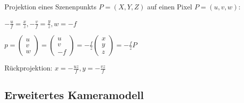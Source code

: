 \documentclass[paper=a4, fontsize=11pt]{scrartcl} %
\numberwithin{equation}{section} %
\numberwithin{figure}{section} %
\numberwithin{table}{section} %
\begin{document}
Projektion eines Szenenpunkts $P = (X,Y,Z)$ auf einen Pixel $P = (u,v,w)$:

$-\frac{u}{f} = \frac{x}{z}, -\frac{v}{f} = \frac{y}{z}, w = -f$

$p = \begin{pmatrix} u \\ v \\ w \end{pmatrix} = \begin{pmatrix} u \\ v \\ -f \end{pmatrix} = -\frac{f}{z} \begin{pmatrix} x \\ y \\ z \end{pmatrix} = -\frac{f}{z} P$

Rückprojektion: $x = -\frac{uz}{f}, y = -\frac{vz}{f}$

\subsection{Erweitertes Kameramodell}
\end{document}
